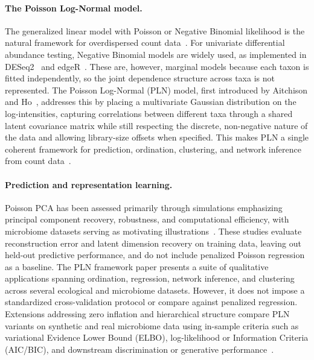 \documentclass[USenglish]{article}
\theoremstyle{dgthm}
\begin{document}
\paragraph{The Poisson Log-Normal model.}
The generalized linear model with Poisson or Negative Binomial likelihood is the natural framework for overdispersed count data~\citep{zhang2017nbmm}.
For univariate differential abundance testing, Negative Binomial models are widely used, as implemented in DESeq2~\citep{Love2014DESeq2} and edgeR~\citep{Robinson2010edgeR}.
These are, however, marginal models because each taxon is fitted independently, so the joint dependence structure across taxa is not represented.
The Poisson Log-Normal (PLN) model, first introduced by Aitchison and Ho~\citep{aitchison1989multivariate}, addresses this by placing a multivariate Gaussian distribution on the log-intensities, capturing correlations between different taxa through a shared latent covariance matrix while still respecting the discrete, non-negative nature of the data and allowing library-size offsets when specified.
This makes PLN a single coherent framework for prediction, ordination, clustering, and network inference from count data~\citep{Chiquet2021, SUBEDI20251255}.

\paragraph{Prediction and representation learning.}
Poisson PCA has been assessed primarily through simulations emphasizing principal component recovery, robustness, and computational efficiency, with microbiome datasets serving as motivating illustrations~\citep{Kenney2021PoissonPCA, Virta2023PoissonPCA}.
These studies evaluate reconstruction error and latent dimension recovery on training data, leaving out held-out predictive performance, and do not include penalized Poisson regression as a baseline.
The PLN framework paper \citep{Chiquet2021} presents a suite of qualitative applications spanning ordination, regression, network inference, and clustering across several ecological and microbiome datasets. 
However, it does not impose a standardized cross-validation protocol or compare against penalized regression.
Extensions addressing zero inflation and hierarchical structure compare PLN variants on synthetic and real microbiome data using in-sample criteria such as variational Evidence Lower Bound (ELBO), log-likelihood or Information Criteria (AIC/BIC), and downstream discrimination or generative performance~\citep{Batardiere2025ZIPLN, Chaussard2025PLNTree}.
\end{document}
